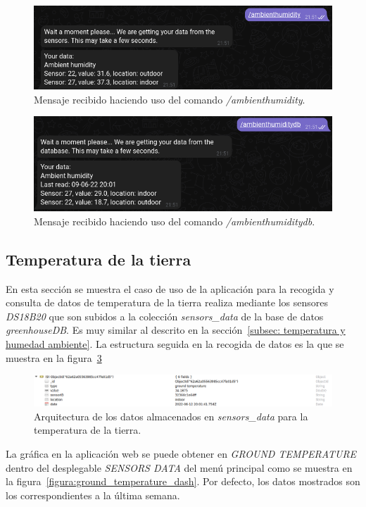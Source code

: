 \documentclass[a4paper, 12pt, oneside]{book}
\begin{document}
\begin{figure}[H]
	\centering
    \includegraphics[width=12cm, keepaspectratio]{img/ambienthumidity}
    \caption{Mensaje recibido haciendo uso del comando \textit{/ambienthumidity}.}
    \label{figura:ambienthumidity}
\end{figure}
\begin{figure}[H]
	\centering
    \includegraphics[width=12cm, keepaspectratio]{img/ambienthumiditydb}
    \caption{Mensaje recibido haciendo uso del comando \textit{/ambienthumiditydb}.}
    \label{figura:ambienthumiditydb}
\end{figure}

\subsection{Temperatura de la tierra}
\label{subsec: temperatura de la tierra}
En esta sección se muestra el caso de uso de la aplicación para la recogida y consulta de datos de temperatura de la tierra realiza mediante los sensores \textit{DS18B20} que son subidos a la colección \textit{sensors\_data} de la base de datos \textit{greenhouseDB}. Es muy similar al descrito en la sección~\ref{subsec: temperatura y humedad ambiente}.
La estructura seguida en la recogida de datos es la que se muestra en la figura~\ref{figura:ground_temperature_robo3t}

\begin{figure}[H]
	\centering
    \includegraphics[width=12cm, keepaspectratio]{img/ground_temperature_robo3t}
    \caption{Arquitectura de los datos almacenados en \textit{sensors\_data} para la temperatura de la tierra.}
    \label{figura:ground_temperature_robo3t}
\end{figure}
La gráfica en la aplicación web se puede obtener en \textit{GROUND TEMPERATURE} dentro del desplegable \textit{SENSORS DATA} del menú principal como se muestra en la figura~\ref{figura:ground_temperature_dash}. Por defecto, los datos mostrados son los correspondientes a la última semana.
\end{document}
